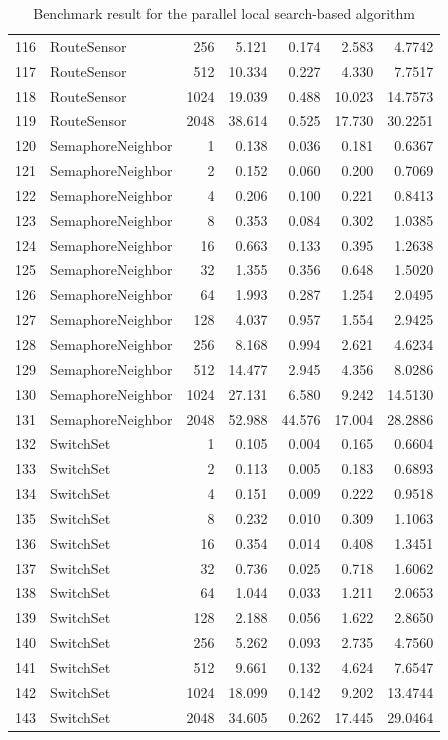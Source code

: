 \begin{table}[ht]
\begin{tabular}{rlrrrrr}
		116 & RouteSensor & 256 & 5.121 & 0.174 & 2.583 & 4.7742 \\ 
		117 & RouteSensor & 512 & 10.334 & 0.227 & 4.330 & 7.7517 \\ 
		118 & RouteSensor & 1024 & 19.039 & 0.488 & 10.023 & 14.7573 \\ 
		119 & RouteSensor & 2048 & 38.614 & 0.525 & 17.730 & 30.2251 \\ 
		\hline
		120 & SemaphoreNeighbor & 1 & 0.138 & 0.036 & 0.181 & 0.6367 \\ 
		121 & SemaphoreNeighbor & 2 & 0.152 & 0.060 & 0.200 & 0.7069 \\ 
		122 & SemaphoreNeighbor & 4 & 0.206 & 0.100 & 0.221 & 0.8413 \\ 
		123 & SemaphoreNeighbor & 8 & 0.353 & 0.084 & 0.302 & 1.0385 \\ 
		124 & SemaphoreNeighbor & 16 & 0.663 & 0.133 & 0.395 & 1.2638 \\ 
		125 & SemaphoreNeighbor & 32 & 1.355 & 0.356 & 0.648 & 1.5020 \\ 
		126 & SemaphoreNeighbor & 64 & 1.993 & 0.287 & 1.254 & 2.0495 \\ 
		127 & SemaphoreNeighbor & 128 & 4.037 & 0.957 & 1.554 & 2.9425 \\ 
		128 & SemaphoreNeighbor & 256 & 8.168 & 0.994 & 2.621 & 4.6234 \\ 
		129 & SemaphoreNeighbor & 512 & 14.477 & 2.945 & 4.356 & 8.0286 \\ 
		130 & SemaphoreNeighbor & 1024 & 27.131 & 6.580 & 9.242 & 14.5130 \\ 
		131 & SemaphoreNeighbor & 2048 & 52.988 & 44.576 & 17.004 & 28.2886 \\ 
		\hline
		132 & SwitchSet & 1 & 0.105 & 0.004 & 0.165 & 0.6604 \\ 
		133 & SwitchSet & 2 & 0.113 & 0.005 & 0.183 & 0.6893 \\ 
		134 & SwitchSet & 4 & 0.151 & 0.009 & 0.222 & 0.9518 \\ 
		135 & SwitchSet & 8 & 0.232 & 0.010 & 0.309 & 1.1063 \\ 
		136 & SwitchSet & 16 & 0.354 & 0.014 & 0.408 & 1.3451 \\ 
		137 & SwitchSet & 32 & 0.736 & 0.025 & 0.718 & 1.6062 \\ 
		138 & SwitchSet & 64 & 1.044 & 0.033 & 1.211 & 2.0653 \\ 
		139 & SwitchSet & 128 & 2.188 & 0.056 & 1.622 & 2.8650 \\ 
		140 & SwitchSet & 256 & 5.262 & 0.093 & 2.735 & 4.7560 \\ 
		141 & SwitchSet & 512 & 9.661 & 0.132 & 4.624 & 7.6547 \\ 
		142 & SwitchSet & 1024 & 18.099 & 0.142 & 9.202 & 13.4744 \\ 
		143 & SwitchSet & 2048 & 34.605 & 0.262 & 17.445 & 29.0464 \\ 
		\hline
	\end{tabular}
	\caption{Benchmark result for the parallel local search-based algorithm}
	\label{tab:tb-par}		
\end{table}